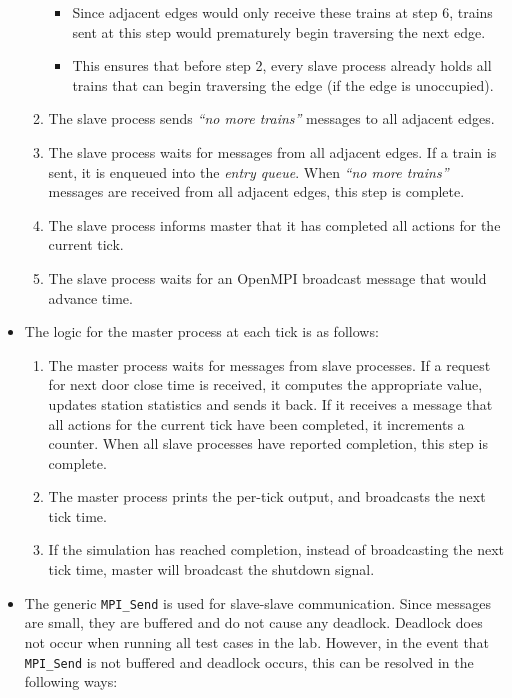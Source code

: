 \documentclass[a4paper,12pt]{article}
\begin{document}
\begin{itemize}
\begin{enumerate}
		            \begin{itemize}
			            \item Since adjacent edges would only receive these trains at step 6, trains sent at this step would prematurely begin traversing the next edge.
			            \item This ensures that before step 2, every slave process already holds all trains that can begin traversing the edge (if the edge is unoccupied).
		            \end{itemize}
		      \item The slave process sends \textit{``no more trains''} messages to all adjacent edges.
		      \item The slave process waits for messages from all adjacent edges. If a train is sent, it is enqueued into the \textit{entry queue}. When \textit{``no more trains''} messages are received from all adjacent edges, this step is complete.
		      \item The slave process informs master that it has completed all actions for the current tick.
		      \item The slave process waits for an OpenMPI broadcast message that would advance time.
	      \end{enumerate}
	\item The logic for the master process at each tick is as follows:
	      \begin{enumerate}
		      \item The master process waits for messages from slave processes. If a request for next door close time is received, it computes the appropriate value, updates station statistics and sends it back. If it receives a message that all actions for the current tick have been completed, it increments a counter. When all slave processes have reported completion, this step is complete.
		      \item The master process prints the per-tick output, and broadcasts the next tick time.
		      \item If the simulation has reached completion, instead of broadcasting the next tick time, master will broadcast the shutdown signal.
	      \end{enumerate}
	\item The generic \texttt{MPI_Send} is used for slave-slave communication. Since messages are small, they are buffered and do not cause any deadlock. Deadlock does not occur when running all test cases in the lab. However, in the event that \texttt{MPI_Send} is not buffered and deadlock occurs, this can be resolved in the following ways:

\end{itemize}
\end{document}
